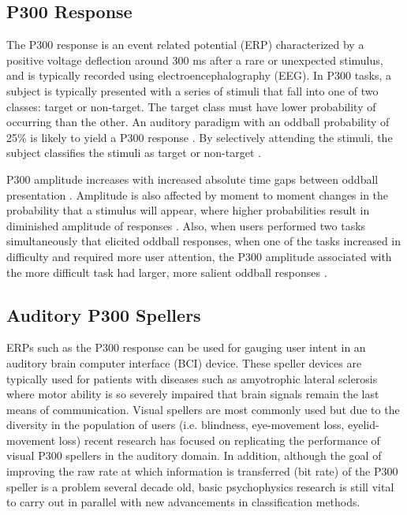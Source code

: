 \documentclass[10pt]{article}
\begin{document}
\subsection{P300 Response} 
The P300 response is an event related
potential (ERP) characterized by a positive voltage deflection
around 300 ms after a rare or unexpected stimulus, and is typically recorded
using electroencephalography (EEG). In P300 tasks, a subject is
typically presented with a series of stimuli that fall into one of
two classes: target or non-target.  The target class must have lower
probability of occurring than the other. An auditory paradigm with
an oddball probability of 25\% is likely to yield a P300
response \cite{Nijboer2008}.  By selectively attending the stimuli, the subject
classifies the stimuli as target or non-target \cite{Wolpaw2012}.

P300 amplitude increases with increased absolute time gaps
between oddball presentation \cite{Gonsalvez2002}. 
Amplitude is also affected by moment to moment changes in the
probability that a stimulus will appear, where higher probabilities
result in diminished amplitude of responses
\cite{Donchin1981}.  Also, when users performed two tasks
simultaneously that elicited oddball responses, when one of
the tasks increased in difficulty and required more user
attention, the P300 amplitude associated with the more
difficult task had larger, more salient oddball responses
\cite{Sirevaag1989}. 

\subsection{Auditory P300 Spellers} 
ERPs such as the P300 response can be used for gauging user intent
in an auditory brain computer interface (BCI) device.
These speller
devices are typically used for patients with diseases such as
amyotrophic lateral sclerosis where motor ability is so severely
impaired that brain signals remain the last means of
communication\cite{Nijboer2008}.  Visual spellers are most commonly
used but due to the diversity in the population of users (i.e.
blindness, eye-movement loss, eyelid-movement loss) recent research
has focused on replicating the performance of visual P300 spellers
in the auditory domain\cite{Hohne2011}.  In addition, although the goal of improving
the raw rate at which information is transferred (bit rate) of
the P300 speller is a problem several decade old, basic
psychophysics research is still vital to carry out in parallel with
new advancements in classification methods.
\end{document}
